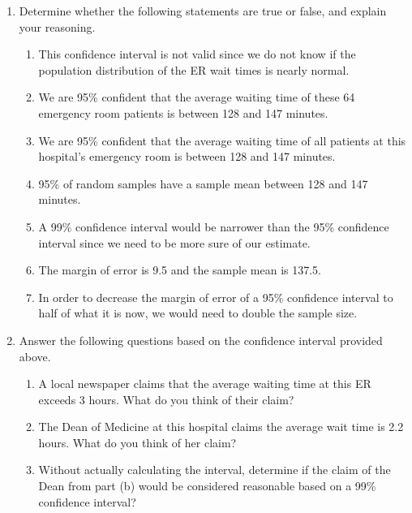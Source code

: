 \documentclass[11pt]{article}
\begin{document}
\begin{enumerate}

\item Determine whether the following statements are true or false, and explain your reasoning. 
\begin{enumerate}

\item This confidence interval is not valid since we do not know if the population distribution of the ER wait times is nearly normal.

\item We are 95\% confident that the average waiting time of these 64 emergency room patients is between 128 and 147 minutes.

\item We are 95\% confident that the average waiting time of all patients at this hospital's emergency room is between 128 and 147 minutes.

\item 95\% of random samples have a sample mean between 128 and 147 minutes.

\item A 99\% confidence interval would be narrower than the 95\% confidence interval since we need to be more sure of our estimate.

\item The margin of error is 9.5 and the sample mean is 137.5.

\item In order to decrease the margin of error of a 95\% confidence interval to half of what it is now, we would need to double the sample size.

\end{enumerate}

\item Answer the following questions based on the confidence interval provided above.

\begin{enumerate}

\item A local newspaper claims that the average waiting time at this ER exceeds 3 hours. What do you think of their claim?
\item The Dean of Medicine at this hospital claims the average wait time is 2.2 hours. What do you think of her claim?
\item Without actually calculating the interval, determine if the claim of the Dean from part (b) would be considered reasonable based on a 99\% confidence interval?
\end{enumerate}

\end{enumerate}

\end{document}
